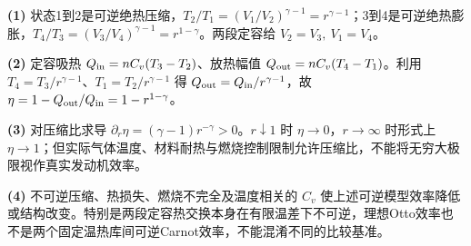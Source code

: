 \par\noindent\textbf{(1)} 状态1到2是可逆绝热压缩，\(T_2/T_1=(V_1/V_2)^{\gamma-1}=r^{\gamma-1}\)；3到4是可逆绝热膨胀，\(T_4/T_3=(V_3/V_4)^{\gamma-1}=r^{1-\gamma}\)。两段定容给 \(V_2=V_3,\ V_1=V_4\)。
\par\noindent\textbf{(2)} 定容吸热 \(Q_{\rm in}=nC_v(T_3-T_2)\)、放热幅值 \(Q_{\rm out}=nC_v(T_4-T_1)\)。利用 \(T_4=T_3/r^{\gamma-1}\)、\(T_1=T_2/r^{\gamma-1}\) 得 \(Q_{\rm out}=Q_{\rm in}/r^{\gamma-1}\)，故 \(\eta=1-Q_{\rm out}/Q_{\rm in}=1-r^{1-\gamma}\)。
\par\noindent\textbf{(3)} 对压缩比求导 \(\partial_r\eta=(\gamma-1)r^{-\gamma}>0\)。\(r\downarrow1\) 时 \(\eta\to0\)，\(r\to\infty\) 时形式上 \(\eta\to1\)；但实际气体温度、材料耐热与燃烧控制限制允许压缩比，不能将无穷大极限视作真实发动机效率。
\par\noindent\textbf{(4)} 不可逆压缩、热损失、燃烧不完全及温度相关的 \(C_v\) 使上述可逆模型效率降低或结构改变。特别是两段定容热交换本身在有限温差下不可逆，理想Otto效率也不是两个固定温热库间可逆Carnot效率，不能混淆不同的比较基准。
